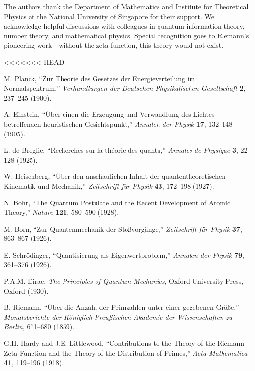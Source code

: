 \documentclass[11pt]{article}
\theoremstyle{plain}
\theoremstyle{definition}
\theoremstyle{remark}
\begin{document}
The authors thank the Department of Mathematics and Institute for Theoretical Physics at the National University of Singapore for their support. We acknowledge helpful discussions with colleagues in quantum information theory, number theory, and mathematical physics. Special recognition goes to Riemann's pioneering work—without the zeta function, this theory would not exist.


<<<<<<< HEAD

\begin{thebibliography}{99}

 M. Planck, ``Zur Theorie des Gesetzes der Energieverteilung im Normalspektrum,'' \emph{Verhandlungen der Deutschen Physikalischen Gesellschaft} \textbf{2}, 237--245 (1900).

 A. Einstein, ``Über einen die Erzeugung und Verwandlung des Lichtes betreffenden heuristischen Gesichtspunkt,'' \emph{Annalen der Physik} \textbf{17}, 132--148 (1905).

 L. de Broglie, ``Recherches sur la théorie des quanta,'' \emph{Annales de Physique} \textbf{3}, 22--128 (1925).

 W. Heisenberg, ``Über den anschaulichen Inhalt der quantentheoretischen Kinematik und Mechanik,'' \emph{Zeitschrift für Physik} \textbf{43}, 172--198 (1927).

 N. Bohr, ``The Quantum Postulate and the Recent Development of Atomic Theory,'' \emph{Nature} \textbf{121}, 580--590 (1928).

 M. Born, ``Zur Quantenmechanik der Stoßvorgänge,'' \emph{Zeitschrift für Physik} \textbf{37}, 863--867 (1926).

 E. Schrödinger, ``Quantisierung als Eigenwertproblem,'' \emph{Annalen der Physik} \textbf{79}, 361--376 (1926).

 P.A.M. Dirac, \emph{The Principles of Quantum Mechanics}, Oxford University Press, Oxford (1930).

 B. Riemann, ``Über die Anzahl der Primzahlen unter einer gegebenen Größe,'' \emph{Monatsberichte der Königlich Preußischen Akademie der Wissenschaften zu Berlin}, 671--680 (1859).

 G.H. Hardy and J.E. Littlewood, ``Contributions to the Theory of the Riemann Zeta-Function and the Theory of the Distribution of Primes,'' \emph{Acta Mathematica} \textbf{41}, 119--196 (1918).


\end{thebibliography}
\end{document}
